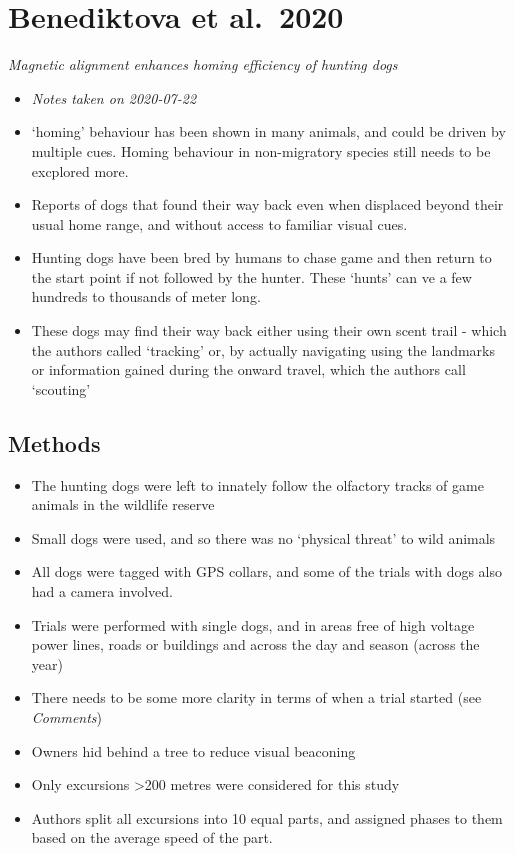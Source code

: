 \documentclass[
]{book}
\providecommand{\tightlist}{%
  \setlength{\itemsep}{0pt}\setlength{\parskip}{0pt}}
\begin{document}
\hypertarget{benediktovadogfield}{%
\chapter{Benediktova et al.~2020}\label{benediktovadogfield}}

\emph{Magnetic alignment enhances homing efficiency of hunting dogs} \citep{benediktova2020magnetic}

\begin{itemize}
\item
  \emph{Notes taken on 2020-07-22}
\item
  `homing' behaviour has been shown in many animals, and could be driven by multiple cues. Homing behaviour in non-migratory species still needs to be excplored more.
\item
  Reports of dogs that found their way back even when displaced beyond their usual home range, and without access to familiar visual cues.
\item
  Hunting dogs have been bred by humans to chase game and then return to the start point if not followed by the hunter. These `hunts' can ve a few hundreds to thousands of meter long.
\item
  These dogs may find their way back either using their own scent trail - which the authors called `tracking' or, by actually navigating using the landmarks or information gained during the onward travel, which the authors call `scouting'
\end{itemize}

\hypertarget{methods}{%
\section{Methods}\label{methods}}

\begin{itemize}
\tightlist
\item
  The hunting dogs were left to innately follow the olfactory tracks of game animals in the wildlife reserve
\item
  Small dogs were used, and so there was no `physical threat' to wild animals
\item
  All dogs were tagged with GPS collars, and some of the trials with dogs also had a camera involved.
\item
  Trials were performed with single dogs, and in areas free of high voltage power lines, roads or buildings and across the day and season (across the year)
\item
  There needs to be some more clarity in terms of when a trial started (see \emph{Comments})
\item
  Owners hid behind a tree to reduce visual beaconing
\item
  Only excursions \textgreater200 metres were considered for this study
\item
  Authors split all excursions into 10 equal parts, and assigned phases to them based on the average speed of the part.
\end{itemize}
\end{document}
